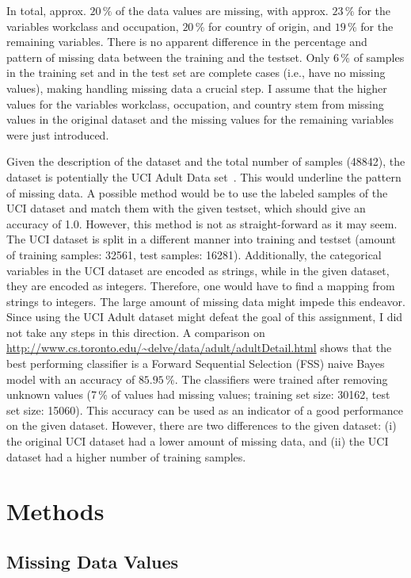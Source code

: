 \documentclass[a4paper]{article}
\begin{document}
In total, approx. $20\,\%$ of the data values are missing, with approx. $23\,\%$ for the variables workclass and occupation, $20\,\%$ for country of origin, and $19\,\%$ for the remaining variables. There is no apparent difference in the percentage and pattern of missing data between the training and the testset. Only $6\,\%$ of samples in the training set and in the test set are complete cases (i.e., have no missing values), making handling missing data a crucial step. I assume that the higher values for the variables workclass, occupation, and country stem from missing values in the original dataset and the missing values for the remaining variables were just introduced. 

Given the description of the dataset and the total number of samples
(48842), the dataset is potentially the UCI Adult Data
set~\cite{lichman2013}. This would underline the pattern of missing
data. A possible method would be to use the labeled samples of the UCI
dataset and match them with the given testset, which should give an
accuracy of 1.0. However, this method is not as straight-forward as it
may seem. The UCI dataset is split in a different manner into training
and testset (amount of training samples: 32561, test samples:
16281). Additionally, the categorical variables in the UCI dataset are
encoded as strings, while in the given dataset, they are encoded as
integers. Therefore, one would have to find a mapping from strings to
integers. The large amount of missing data might impede this
endeavor. Since using the UCI Adult dataset might defeat the goal of
this assignment, I did not take any steps in this direction. A
comparison on
\url{http://www.cs.toronto.edu/~delve/data/adult/adultDetail.html}
shows that the best performing classifier is a Forward Sequential
Selection (FSS) naive Bayes model with an accuracy of $85.95\,\%$. The
classifiers were trained after removing unknown values (7\,\% of
values had missing values; training set size: 30162, test set size:
15060). This accuracy can be used as an indicator of a good
performance on the given dataset. However, there are two differences
to the given dataset: (i) the original UCI dataset had a lower amount
of missing data, and (ii) the UCI dataset had a higher number of
training samples.

\section{Methods}
\label{sec:methods}

\subsection{Missing Data Values}
\end{document}
